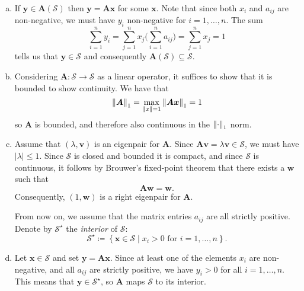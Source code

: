 \documentclass[12pt, oneside, article, a4paper]{memoir}
\newcommand{\mat}[1]{\bm{#1}}
\begin{document}
\begin{enumerate}[a)]
    \item If \( \mat{y} \in \mat{A}(\mathcal{S}) \) then \( \mat{y} = \mat{Ax}
        \) for some \( \mat{x} \). Note that since both \( x_i \) and \( a_{ij}
        \) are non-negative, we must have \( y_i \) non-negative for \( i = 1,
        \ldots, n \). The sum
        \begin{equation}
            \sum_{i=1}^n y_i = \sum_{j=1}^n x_{j} \Big(\sum^{n}_{i=1}
            a_{ij}\Big) = \sum_{j=1}^n x_j = 1
        \end{equation}
        tells us that \( \mat{y} \in \mathcal{S} \) and consequently \(
        \mat{A}(\mathcal{S}) \subseteq \mathcal{S} \).

    \item Considering \( \mat{A} \colon \mathcal{S} \to \mathcal{S} \) as a
        linear operator, it suffices to show that it is bounded to show
        continuity. We have that
        \begin{equation}
            \norm{\mat{A}}_1 = \max_{\norm{x} = 1}\norm{\mat{Ax}}_1 = 1
        \end{equation}
        so \( \mat{A} \) is bounded, and therefore also continuous in the \(
        \norm{\cdot}_1 \) norm.
    
    \item Assume that \( (\lambda, \mat{v}) \) is an eigenpair for \( \mat{A}
        \). Since \( \mat{Av} = \lambda \mat{v} \in \mathcal{S} \), we must
        have \( |\lambda| \leq 1 \). Since \( \mathcal{S} \) is closed and
        bounded it is compact, and since \( \mathcal{S} \) is continuous, it
        follows by Brouwer's fixed-point theorem that there exists a  \(
        \mat{w} \) such that
        \begin{equation}
            \mat{Aw} = \mat{w}.
        \end{equation}
        Consequently, \( (1, \mat{w}) \) is a right eigenpair for \( \mat{A}
        \).

        From now on, we assume that the matrix entries \( a_{ij}  \) are all
        strictly positive. Denote by \( \mathcal{S}^\star \) the
        \emph{interior} of \( \mathcal{S} \):
        \begin{equation}
            \mathcal{S}^\star \coloneqq \left\{ \mat{x} \in \mathcal{S}  \mid
            x_i > 0 \text{ for  } i = 1, \ldots, n\right\}.
        \end{equation}
        
    \item Let \( \mat{x} \in \mathcal{S} \) and set \( \mat{y} = \mat{Ax} \).
        Since at least one of the elements \( x_i \) are non-negative, and all
        \( a_{ij} \) are strictly positive, we have \( y_i > 0\) for all \( i =
        1, \ldots, n \). This means that \(\mat{y} \in \mathcal{S}^\star \), so \(
        \mat{A} \) maps \( \mathcal{S} \) to its interior.
    

\end{enumerate}
\end{document}
